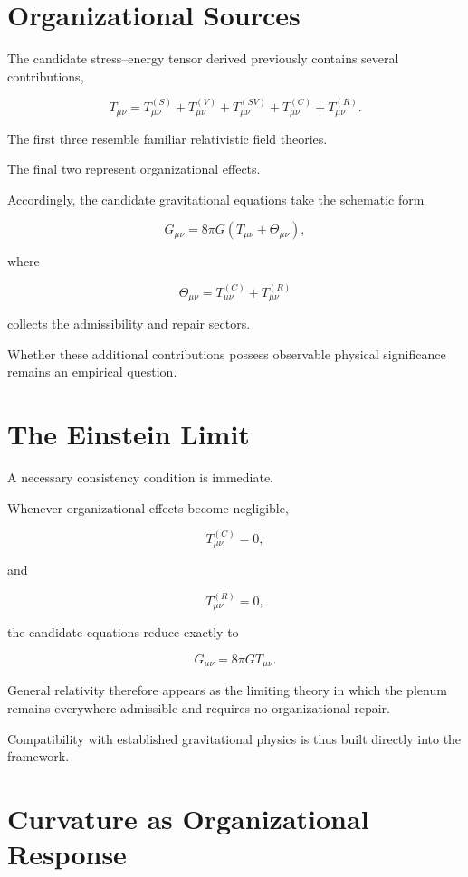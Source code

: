 \documentclass[11pt,oneside]{book}
\numberwithin{equation}{chapter}
\theoremstyle{definition}
\theoremstyle{plain}
\begin{document}
\section{Organizational Sources}

The candidate stress--energy tensor derived previously contains several
contributions,

\[
T_{\mu\nu}
=
T^{(S)}_{\mu\nu}
+
T^{(V)}_{\mu\nu}
+
T^{(SV)}_{\mu\nu}
+
T^{(C)}_{\mu\nu}
+
T^{(R)}_{\mu\nu}.
\]

The first three resemble familiar relativistic field theories.

The final two represent organizational effects.

Accordingly, the candidate gravitational equations take the schematic form

\[
G_{\mu\nu}
=
8\pi G
\left(
T_{\mu\nu}
+
\Theta_{\mu\nu}
\right),
\]

where

\[
\Theta_{\mu\nu}
=
T^{(C)}_{\mu\nu}
+
T^{(R)}_{\mu\nu}
\]

collects the admissibility and repair sectors.

Whether these additional contributions possess observable physical
significance remains an empirical question.

\section{The Einstein Limit}

A necessary consistency condition is immediate.

Whenever organizational effects become negligible,

\[
T^{(C)}_{\mu\nu}=0,
\]

and

\[
T^{(R)}_{\mu\nu}=0,
\]

the candidate equations reduce exactly to

\[
G_{\mu\nu}
=
8\pi G
T_{\mu\nu}.
\]

General relativity therefore appears as the limiting theory in which the
plenum remains everywhere admissible and requires no organizational repair.

Compatibility with established gravitational physics is thus built directly
into the framework.

\section{Curvature as Organizational Response}
\end{document}
